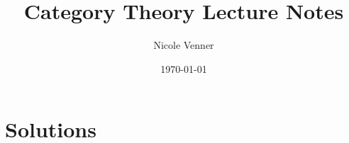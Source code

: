 \documentclass[article,10pt]{memoir}
\title{Category Theory Lecture Notes}
\author{Nicole Venner}
\date{\today}
\begin{document}















\printbibliography
\chapter{Solutions}
\shipoutAnswer

\end{document}

